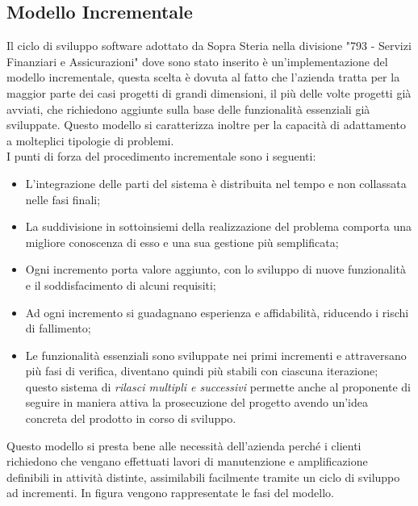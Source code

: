 	\subsection{Modello Incrementale}
	
	Il ciclo di sviluppo software adottato da Sopra Steria nella divisione "793 - Servizi Finanziari e Assicurazioni" dove sono stato inserito è un'implementazione del modello incrementale, questa scelta è dovuta al fatto che l'azienda tratta per la maggior parte dei casi progetti di grandi dimensioni, il più delle volte progetti già avviati, che richiedono aggiunte sulla base delle funzionalità essenziali già sviluppate. Questo modello si caratterizza inoltre per la capacità di adattamento a molteplici tipologie di problemi.\\
	
	I punti di forza del procedimento incrementale sono i seguenti:
	\begin{itemize}
		\item L'integrazione delle parti del sistema è distribuita nel tempo e non collassata nelle fasi finali;
		\item La suddivisione in sottoinsiemi della realizzazione del problema comporta una migliore conoscenza di esso e una sua gestione più semplificata;
		\item Ogni incremento porta valore aggiunto, con lo sviluppo di nuove funzionalità e il soddisfacimento di alcuni requisiti;
		\item Ad ogni incremento si guadagnano esperienza e affidabilità, riducendo i rischi di fallimento;
		\item Le funzionalità essenziali sono sviluppate nei primi incrementi e attraversano più fasi di verifica, diventano quindi più stabili con ciascuna iterazione; questo sistema di \textit{rilasci multipli e successivi} permette anche al proponente di seguire in maniera attiva la prosecuzione del progetto avendo un'idea concreta del prodotto in corso di sviluppo.
	\end{itemize}
	
	Questo modello si presta bene alle necessità dell'azienda perché i clienti richiedono che vengano effettuati lavori di manutenzione e amplificazione definibili in attività distinte, assimilabili facilmente tramite un ciclo di sviluppo ad incrementi. In figura vengono rappresentate le fasi del modello.\\
	
